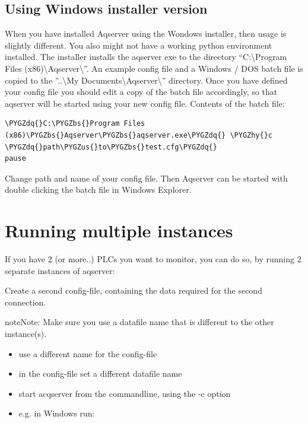 \documentclass[a4paper,10pt,english]{sphinxmanual}
\def\PYGZbs{\char`\\}
\def\PYGZus{\char`\_}
\def\PYGZhy{\char`\-}
\def\PYGZdq{\char`\"}
\begin{document}
\section{Using Windows installer version}
\label{usage:using-windows-installer-version}
When you have installed Aqserver using the Wondows installer, then usage is slightly different. You also might not have a working python environment installed. The installer installs the aqserver exe to  the directory ``C:\textbackslash{}Program Files (x86)\textbackslash{}Aqserver\textbackslash{}''. An example config file and a Windows / DOS batch file is copied to the ''..\textbackslash{}My Documents\textbackslash{}Aqserver\textbackslash{}'' directory. Once you have defined your config file you should edit a copy of the batch file accordingly, so that aqserver will be started using your new config file.
Contents of the batch file:

\begin{Verbatim}[commandchars=\\\{\}]
\PYGZdq{}C:\PYGZbs{}Program Files (x86)\PYGZbs{}Aqserver\PYGZbs{}aqserver.exe\PYGZdq{} \PYGZhy{}c \PYGZdq{}path\PYGZus{}to\PYGZbs{}test.cfg\PYGZdq{}
pause
\end{Verbatim}

Change path and name of your config file. Then Aqserver can be started with double clicking the batch file in Windows Explorer.


\chapter{Running multiple instances}
\label{instance:running-multiple-instances}\label{instance::doc}
If you have 2 (or more..) PLCs you want to monitor, you can do so, by running 2 separate
instances of aqserver:

Create a second config-file, containing the data required for the second connection.

\begin{notice}{note}{Note:}
Make sure you use a datafile name that is different to the other instance(s).
\end{notice}
\begin{itemize}
\item {} 
use a different name for the config-file

\item {} 
in the config-file set a different datafile name

\item {} 
start acqserver from the commandline, using the -c option

\item {} 
e.g. in Windows run:

\end{itemize}
\end{document}
